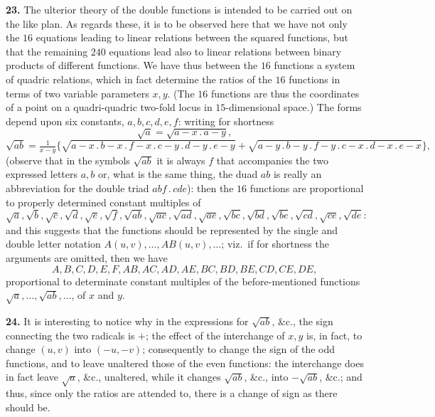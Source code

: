 \documentclass[11pt]{article}
\begin{document}
\textbf{23.} The ulterior theory of the double functions is intended to be carried out on the like plan. As regards these, it is to be observed here that we have not only the $16$ equations leading to linear relations between the squared functions, but that the remaining $240$ equations lead also to linear relations between binary products of different functions. We have thus between the $16$ functions a system of quadric relations, which in fact determine the ratios of the $16$ functions in terms of two variable parameters $x,y$. (The $16$ functions are thus the coordinates of a point on a quadri-quadric two-fold locus in $15$-dimensional space.) The forms depend upon six constants, $a,b,c,d,e,f$: writing for shortness
\[
\sqrt{a} = \sqrt{a - x\mathbin{.}a - y},
\]
\[
\sqrt{ab} = \tfrac{1}{x - y}\bigl\{\sqrt{a - x\mathbin{.}b - x\mathbin{.}f - x\mathbin{.}c - y\mathbin{.}d - y\mathbin{.}e - y} + \sqrt{a - y\mathbin{.}b - y\mathbin{.}f - y\mathbin{.}c - x\mathbin{.}d - x\mathbin{.}e - x}\bigr\},
\]
(observe that in the symbols $\sqrt{ab}$ it is always $f$ that accompanies the two expressed letters $a,b$ or, what is the same thing, the duad $ab$ is really an abbreviation for the double triad $abf\mathbin{.}cde$): then the $16$ functions are proportional to properly determined constant multiples of
\[
\sqrt{a},\sqrt{b},\sqrt{c},\sqrt{d},\sqrt{e},\sqrt{f},\sqrt{ab},\sqrt{ac},\sqrt{ad},\sqrt{ae},\sqrt{bc},\sqrt{bd},\sqrt{be},\sqrt{cd},\sqrt{ce},\sqrt{de}:
\]
and this suggests that the functions should be represented by the single and double letter notation $A(u,v),\ldots,AB(u,v),\ldots$; viz.\ if for shortness the arguments are omitted, then we have
\[
A, B, C, D, E, F, AB, AC, AD, AE, BC, BD, BE, CD, CE, DE,
\]
proportional to determinate constant multiples of the before-mentioned functions $\sqrt{a},\ldots,\sqrt{ab},\ldots$, of $x$ and $y$.

\medskip

\textbf{24.} It is interesting to notice why in the expressions for $\sqrt{ab}$, \&c., the sign connecting the two radicals is $+$; the effect of the interchange of $x,y$ is, in fact, to change $(u,v)$ into $(-u, -v)$; consequently to change the sign of the odd functions, and to leave unaltered those of the even functions: the interchange does in fact leave $\sqrt{a}$, \&c., unaltered, while it changes $\sqrt{ab}$, \&c., into $-\sqrt{ab}$, \&c.; and thus, since only the ratios are attended to, there is a change of sign as there should be.

\medskip
\end{document}
